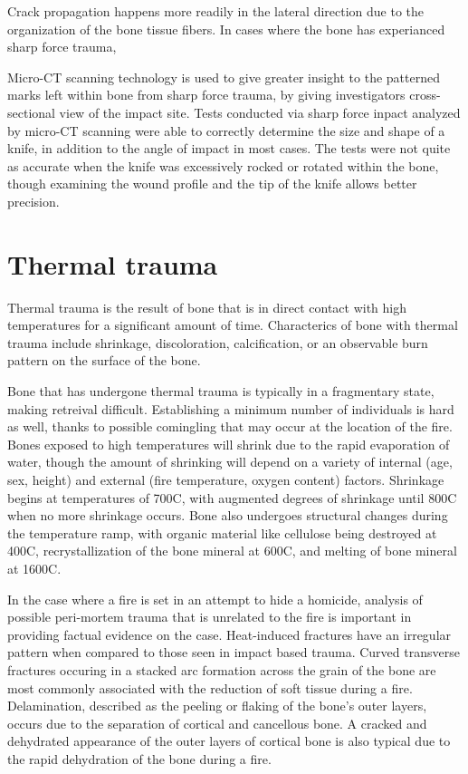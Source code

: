 \documentclass[titlepage]{article}
\begin{document}
Crack propagation happens more readily in the lateral direction due to the organization of the bone tissue fibers.\cite{mechanics} In cases where the bone has experianced sharp force trauma,


Micro-CT scanning technology is used to give greater insight to the patterned marks left within bone from sharp force trauma, by giving investigators cross-sectional view of the impact site. Tests conducted via sharp force inpact analyzed by micro-CT scanning were able to correctly determine the size and shape of a knife, in addition to the angle of impact in most cases. The tests were not quite as accurate when the knife was excessively rocked or rotated within the bone, though examining the wound profile and the tip of the knife allows better precision.\cite{micro-ct}


\newpage
\section{Thermal trauma}
Thermal trauma is the result of bone that is in direct contact with high temperatures for a significant amount of time. Characterics of bone with thermal trauma include shrinkage, discoloration, calcification, or an observable burn pattern on the surface of the bone.\cite{trauma}

Bone that has undergone thermal trauma is typically in a fragmentary state, making retreival difficult. Establishing a minimum number of individuals is hard as well, thanks to possible comingling that may occur at the location of the fire. Bones exposed to high temperatures will shrink due to the rapid evaporation of water, though the amount of shrinking will depend on a variety of internal (age, sex, height) and external (fire temperature, oxygen content) factors.  Shrinkage begins at temperatures of 700C, with augmented degrees of shrinkage until 800C when no more shrinkage occurs. Bone also undergoes structural changes during the temperature ramp, with organic material like cellulose being destroyed at 400C, recrystallization of the bone mineral at 600C, and melting of bone mineral at 1600C. \cite{fire}

In the case where a fire is set in an attempt to hide a homicide, analysis of possible peri-mortem trauma that is unrelated to the fire is important in providing factual evidence on the case. Heat-induced fractures have an irregular pattern when compared to those seen in impact based trauma. Curved transverse fractures occuring in a stacked arc formation across the grain of the bone are most commonly associated with the reduction of soft tissue during a fire. Delamination, described as the peeling or flaking of the bone's outer layers, occurs due to the separation of cortical and cancellous bone. A cracked and dehydrated appearance of the outer layers of cortical bone is also typical due to the rapid dehydration of the bone during a fire.\cite{fire-bone}
\end{document}
